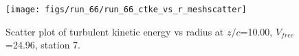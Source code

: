 \begin{figure}[H]
\centering
\texttt{[image: figs/run\_66/run\_66\_ctke\_vs\_r\_meshscatter]}
\caption{Scatter plot of turbulent kinetic energy vs radius at $z/c$=10.00, $V_{free}$=24.96, station 7.}
\label{fig:run_66_ctke_vs_r_meshscatter}
\end{figure}


